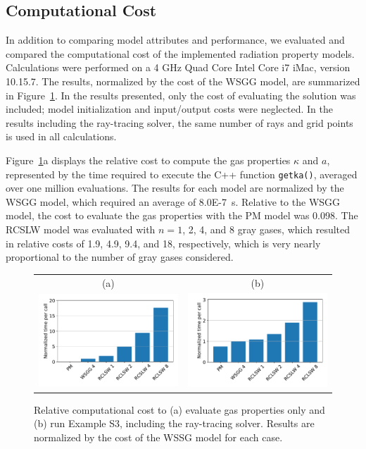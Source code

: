 \documentclass[preprint,12pt]{elsarticle}
\begin{document}

\subsection{Computational Cost} \label{s:cost}

In addition to comparing model attributes and performance, we evaluated and compared the computational cost of the implemented radiation property models.
Calculations were performed on a 4 GHz Quad Core Intel Core i7 iMac, version 10.15.7. The results, normalized by the cost of the WSGG model, are summarized in Figure~\ref{f:cost}.
In the results presented, only the cost of evaluating the solution was included; model initialization and input/output costs were neglected. In the results including the ray-tracing solver, the same number of rays and grid points is used in all calculations.

Figure~\ref{f:cost}a displays the relative cost to compute the gas properties $\kappa$ and $a$, represented by the time required to execute the C++ function \texttt{get\textunderscore k\textunderscore a()}, averaged over one million evaluations. The results for each model are normalized by the WSGG model, which required an average of 8.0E-7~s. Relative to the WSGG model, the cost to evaluate the gas properties with the PM model was 0.098. The RCSLW model was evaluated with $n=1$, 2, 4, and 8 gray gases, which resulted in relative costs of 1.9, 4.9, 9.4, and 18, respectively, which is very nearly proportional to the number of gray gases considered.
%
\begin{figure}
\begin{center}
\begin{tabular}{c c}
(a) & (b) \\
\includegraphics[width=2.5 in]{fig_getka_c++.pdf} &
\includegraphics[width=2.5 in]{fig_exS3_c++.pdf}
\end{tabular}
\caption{Relative computational cost to (a) evaluate gas properties only and (b) run Example S3, including the ray-tracing solver. Results are normalized by the cost of the WSSG model for each case.}
\label{f:cost}
\end{center}
\end{figure}
%
\end{document}
